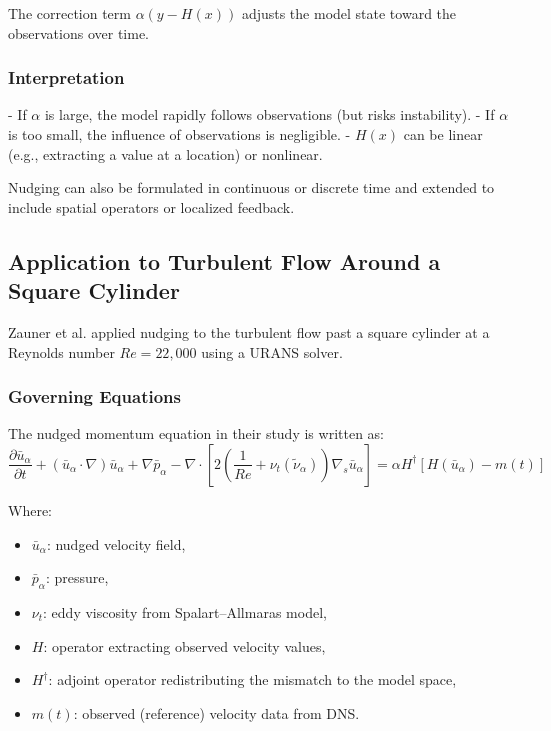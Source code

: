 \documentclass[a4paper]{article}
\begin{document}
The correction term $ \alpha (y - H(x)) $ adjusts the model state toward the observations over time.

\subsubsection*{Interpretation}

- If $\alpha$ is large, the model rapidly follows observations (but risks instability).
- If $\alpha$ is too small, the influence of observations is negligible.
- $H(x)$ can be linear (e.g., extracting a value at a location) or nonlinear.

Nudging can also be formulated in continuous or discrete time and extended to include spatial operators or localized feedback.

\subsection{Application to Turbulent Flow Around a Square Cylinder}

Zauner et al. \parencite{zauner2020nudging} applied nudging to the turbulent flow past a square cylinder at a Reynolds number $Re = 22{,}000$ using a URANS solver.

\subsubsection*{Governing Equations}

The nudged momentum equation in their study is written as:
\[
\frac{\partial \bar{u}_\alpha}{\partial t} + (\bar{u}_\alpha \cdot \nabla)\bar{u}_\alpha + \nabla \bar{p}_\alpha - \nabla \cdot \left[2\left(\frac{1}{Re} + \nu_t(\tilde{\nu}_\alpha)\right) \nabla_s \bar{u}_\alpha\right] = \alpha H^\dagger [H(\bar{u}_\alpha) - m(t)]
\]

Where:
\begin{itemize}
  \item $\bar{u}_\alpha$: nudged velocity field,
  \item $\bar{p}_\alpha$: pressure,
  \item $\nu_t$: eddy viscosity from Spalart–Allmaras model,
  \item $H$: operator extracting observed velocity values,
  \item $H^\dagger$: adjoint operator redistributing the mismatch to the model space,
  \item $m(t)$: observed (reference) velocity data from DNS.
\end{itemize}
\end{document}
